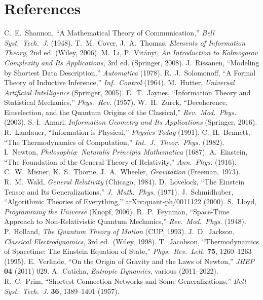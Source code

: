 \documentclass[aps,preprint,onecolumn,longbibliography,nofootinbib]{revtex4-2}
\numberwithin{equation}{section}
\begin{document}
\section*{References}
\begin{thebibliography}{99}
 C.~E.~Shannon, ``A Mathematical Theory of Communication,'' \emph{Bell Syst.\ Tech.\ J.} (1948).
 T.~M.~Cover, J.~A.~Thomas, \emph{Elements of Information Theory}, 2nd ed. (Wiley, 2006).
 M.~Li, P.~Vit\'anyi, \emph{An Introduction to Kolmogorov Complexity and Its Applications}, 3rd ed. (Springer, 2008).
 J.~Rissanen, ``Modeling by Shortest Data Description,'' \emph{Automatica} (1978).
 R.~J.~Solomonoff, ``A Formal Theory of Inductive Inference,'' \emph{Inf.\ Control} (1964).
 M.~Hutter, \emph{Universal Artificial Intelligence} (Springer, 2005).
 E.~T.~Jaynes, ``Information Theory and Statistical Mechanics,'' \emph{Phys.\ Rev.} (1957).
 W.~H.~Zurek, ``Decoherence, Einselection, and the Quantum Origins of the Classical,'' \emph{Rev.\ Mod.\ Phys.} (2003).
 S.-I.~Amari, \emph{Information Geometry and Its Applications} (Springer, 2016).
 R.~Landauer, ``Information is Physical,'' \emph{Physics Today} (1991).
 C.~H.~Bennett, ``The Thermodynamics of Computation,'' \emph{Int.\ J.\ Theor.\ Phys.} (1982).
 I.~Newton, \emph{Philosophi\ae\ Naturalis Principia Mathematica} (1687).
 A.~Einstein, ``The Foundation of the General Theory of Relativity,'' \emph{Ann.\ Phys.} (1916).
 C.~W.~Misner, K.~S.~Thorne, J.~A.~Wheeler, \emph{Gravitation} (Freeman, 1973).
 R.~M.~Wald, \emph{General Relativity} (Chicago, 1984).
 D.~Lovelock, ``The Einstein Tensor and Its Generalizations,'' \emph{J.\ Math.\ Phys.} (1971).
 J.~Schmidhuber, ``Algorithmic Theories of Everything,'' arXiv:quant-ph/0011122 (2000).
 S.~Lloyd, \emph{Programming the Universe} (Knopf, 2006).
 R.~P.~Feynman, ``Space-Time Approach to Non-Relativistic Quantum Mechanics,'' \emph{Rev.\ Mod.\ Phys.} (1948).
 P.~Holland, \emph{The Quantum Theory of Motion} (CUP, 1993).
 J.~D.~Jackson, \emph{Classical Electrodynamics}, 3rd ed.\ (Wiley, 1998).
 T.~Jacobson, ``Thermodynamics of Spacetime: The Einstein Equation of State,'' \emph{Phys.\ Rev.\ Lett.} \textbf{75}, 1260–1263 (1995).
 E.~Verlinde, ``On the Origin of Gravity and the Laws of Newton,'' \emph{JHEP} \textbf{04} (2011) 029.
 A.~Caticha, \emph{Entropic Dynamics}, various (2011–2022).
 R.~C.~Prim, ``Shortest Connection Networks and Some Generalizations,'' \emph{Bell Syst.\ Tech.\ J.} \textbf{36}, 1389–1401 (1957).
\end{thebibliography}
\end{document}
